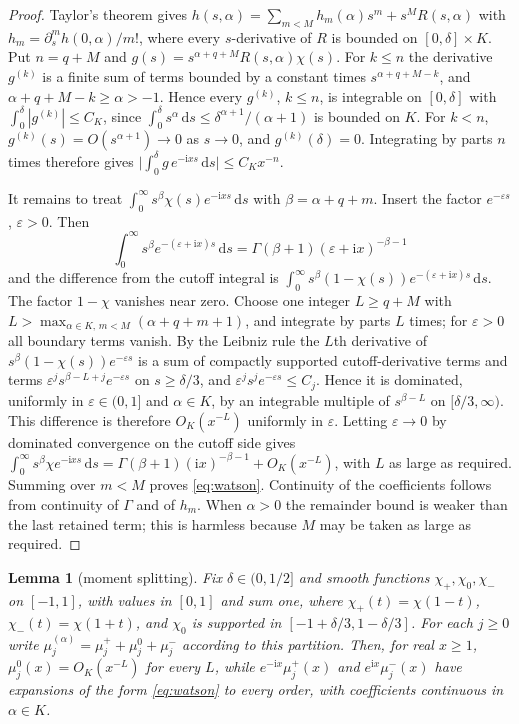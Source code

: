 \documentclass[11pt]{article}
\numberwithin{equation}{section}
\newtheorem{lemma}[theorem]{Lemma}
\theoremstyle{remark}
\newcommand{\ii}{\mathrm{i}}
\newcommand{\dd}{\,\mathrm{d}}
\begin{document}
\begin{proof}
Taylor's theorem gives
$h(s,\alpha)=\sum_{m<M}h_m(\alpha)s^m+s^MR(s,\alpha)$ with
$h_m=\partial_s^mh(0,\alpha)/m!$, where every $s$-derivative of $R$ is
bounded on $[0,\delta]\times K$. Put $n=q+M$ and
$g(s)=s^{\alpha+q+M}R(s,\alpha)\chi(s)$. For $k\le n$ the derivative
$g^{(k)}$ is a finite sum of terms bounded by a constant times
$s^{\alpha+q+M-k}$, and $\alpha+q+M-k\ge\alpha>-1$. Hence every
$g^{(k)}$, $k\le n$, is integrable on $[0,\delta]$ with
$\int_0^\delta|g^{(k)}|\le C_K$, since
$\int_0^\delta s^{\alpha}\dd s\le\delta^{\alpha+1}/(\alpha+1)$ is
bounded on $K$. For $k<n$, $g^{(k)}(s)=O(s^{\alpha+1})\to0$ as
$s\to0$, and $g^{(k)}(\delta)=0$. Integrating by parts $n$ times
therefore gives $\bigl|\int_0^\delta g\,e^{-\ii xs}\dd s\bigr|\le
C_Kx^{-n}$.

It remains to treat $\int_0^\infty s^\beta\chi(s)e^{-\ii xs}\dd s$ with
$\beta=\alpha+q+m$. Insert the factor $e^{-\varepsilon s}$,
$\varepsilon>0$. Then
\[
 \int_0^\infty s^\beta e^{-(\varepsilon+\ii x)s}\dd s
 =\Gamma(\beta+1)(\varepsilon+\ii x)^{-\beta-1}
\]
and the difference from the cutoff integral is
$\int_0^\infty s^\beta(1-\chi(s))e^{-(\varepsilon+\ii x)s}\dd s$.
The factor $1-\chi$ vanishes near zero. Choose one integer
$L\ge q+M$ with $L>\max_{\alpha\in K,\,m<M}(\alpha+q+m+1)$, and
integrate by parts $L$ times; for $\varepsilon>0$ all boundary terms
vanish. By the Leibniz rule the $L$th derivative of
$s^\beta(1-\chi(s))e^{-\varepsilon s}$ is a sum of compactly supported
cutoff-derivative terms and terms
$\varepsilon^js^{\beta-L+j}e^{-\varepsilon s}$ on $s\ge\delta/3$, and
$\varepsilon^js^je^{-\varepsilon s}\le C_j$. Hence it is dominated,
uniformly in $\varepsilon\in(0,1]$ and $\alpha\in K$, by an integrable
multiple of $s^{\beta-L}$ on $[\delta/3,\infty)$. This difference is therefore
$O_K(x^{-L})$ uniformly in $\varepsilon$. Letting $\varepsilon\to0$ by
dominated convergence on the cutoff side gives
$\int_0^\infty s^\beta\chi e^{-\ii xs}\dd s
=\Gamma(\beta+1)(\ii x)^{-\beta-1}+O_K(x^{-L})$, with $L$ as large as
required. Summing over $m<M$ proves \eqref{eq:watson}. Continuity of the
coefficients follows from continuity of $\Gamma$ and of $h_m$. When
$\alpha>0$ the remainder bound is weaker than the last retained term;
this is harmless because $M$ may be taken as large as required.
\end{proof}

\begin{lemma}[moment splitting]\label{lem:momentsplit}
Fix $\delta\in(0,1/2]$ and smooth functions $\chi_+,\chi_0,\chi_-$ on
$[-1,1]$, with values in $[0,1]$ and sum one, where $\chi_+(t)=\chi(1-t)$,
$\chi_-(t)=\chi(1+t)$, and $\chi_0$ is supported in
$[-1+\delta/3,1-\delta/3]$. For each $j\ge0$ write
$\mu_j^{(\alpha)}=\mu_j^++\mu_j^0+\mu_j^-$ according to this partition. Then,
for real $x\ge1$, $\mu_j^0(x)=O_K(x^{-L})$ for every $L$, while
$e^{-\ii x}\mu_j^+(x)$ and $e^{\ii x}\mu_j^-(x)$ have expansions of the form
\eqref{eq:watson} to every order, with coefficients continuous in
$\alpha\in K$.
\end{lemma}
\end{document}
